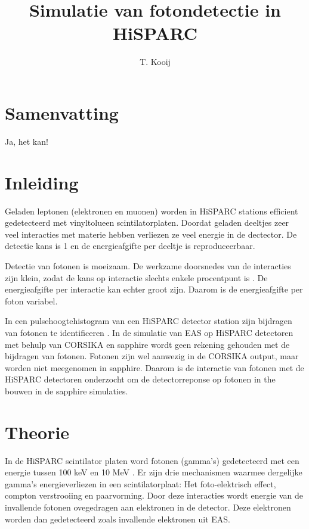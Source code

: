 \documentclass[a4paper,11pt]{article}
\author{T. Kooij}
\title{Simulatie van fotondetectie in HiSPARC}
\begin{document}
\maketitle
\tableofcontents

\section{Samenvatting}
Ja, het kan!

\section{Inleiding}
Geladen leptonen (elektronen en muonen) worden in HiSPARC stations efficient gedetecteerd met vinyltolueen scintilatorplaten. Doordat geladen deeltjes zeer veel interacties met materie hebben verliezen ze veel energie in de dectector. De detectie kans is 1 en de energieafgifte per deeltje is reproduceerbaar.

Detectie van fotonen is moeizaam. De werkzame doorsnedes van de interacties zijn klein, zodat de kans op interactie slechts enkele procentpunt is \citep*{Pennink:2010}. De energieafgifte per interactie kan echter groot zijn. Daarom is de energieafgifte per foton variabel.

In een pulsehoogtehistogram van een HiSPARC detector station zijn bijdragen van fotonen te identificeren \citep*{Pennink:2010}. In de simulatie van EAS op HiSPARC detectoren met behulp van CORSIKA en sapphire wordt geen rekening gehouden met de bijdragen van fotonen. Fotonen zijn wel aanwezig in de CORSIKA output, maar worden niet meegenomen in sapphire. Daarom is de interactie van fotonen met de HiSPARC detectoren onderzocht om de detectorreponse op fotonen in the bouwen in de sapphire simulaties.

\section{Theorie}
In de HiSPARC scintilator platen word fotonen (gamma's) gedetecteerd met een energie tussen 100 keV en 10 MeV \citep*{Steijger2010-gammas}. Er zijn drie mechanismen waarmee dergelijke gamma's energieverliezen in een scintilatorplaat: Het foto-elektrisch effect, compton verstrooiing en paarvorming. Door deze interacties wordt energie van de invallende fotonen ovegedragen aan elektronen in de detector. Deze elektronen worden dan gedetecteerd zoals invallende elektronen uit EAS.
\end{document}
